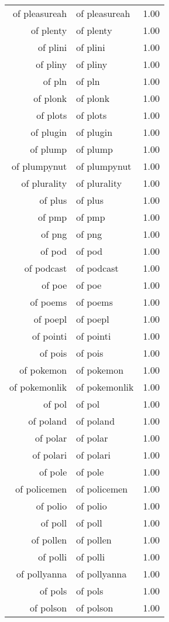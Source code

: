 \begin{table}[ht]
\begin{tabular}{rlr}
  of pleasureah & of pleasureah & 1.00 \\ 
  of plenty & of plenty & 1.00 \\ 
  of plini & of plini & 1.00 \\ 
  of pliny & of pliny & 1.00 \\ 
  of pln & of pln & 1.00 \\ 
  of plonk & of plonk & 1.00 \\ 
  of plots & of plots & 1.00 \\ 
  of plugin & of plugin & 1.00 \\ 
  of plump & of plump & 1.00 \\ 
  of plumpynut & of plumpynut & 1.00 \\ 
  of plurality & of plurality & 1.00 \\ 
  of plus & of plus & 1.00 \\ 
  of pmp & of pmp & 1.00 \\ 
  of png & of png & 1.00 \\ 
  of pod & of pod & 1.00 \\ 
  of podcast & of podcast & 1.00 \\ 
  of poe & of poe & 1.00 \\ 
  of poems & of poems & 1.00 \\ 
  of poepl & of poepl & 1.00 \\ 
  of pointi & of pointi & 1.00 \\ 
  of pois & of pois & 1.00 \\ 
  of pokemon & of pokemon & 1.00 \\ 
  of pokemonlik & of pokemonlik & 1.00 \\ 
  of pol & of pol & 1.00 \\ 
  of poland & of poland & 1.00 \\ 
  of polar & of polar & 1.00 \\ 
  of polari & of polari & 1.00 \\ 
  of pole & of pole & 1.00 \\ 
  of policemen & of policemen & 1.00 \\ 
  of polio & of polio & 1.00 \\ 
  of poll & of poll & 1.00 \\ 
  of pollen & of pollen & 1.00 \\ 
  of polli & of polli & 1.00 \\ 
  of pollyanna & of pollyanna & 1.00 \\ 
  of pols & of pols & 1.00 \\ 
  of polson & of polson & 1.00 \\ 

\end{tabular}
\end{table}
